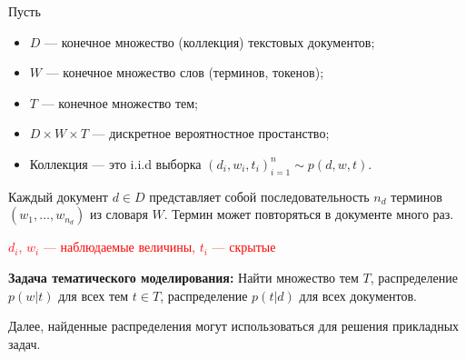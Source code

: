 \documentclass[unicode,9pt, pdf]{beamer}
\begin{document}
 \begin{frame}{Пусть}
    
    \begin{itemize}
        \item $D$ --- конечное множество (коллекция) текстовых документов;
        \item $W$ --- конечное множество слов (терминов, токенов);
        \item $T$ --- конечное множество тем;
         \item $D \times W \times T$ --- дискретное вероятностное простанство;
         \item Коллекция --- это i.i.d выборка $(d_i, w_i, t_i)^n_{i=1} \sim p(d, w, t)$.
     \end{itemize}
     
     \vspace{0.2 cm}
     
     Каждый документ $d \in D$ представляет собой последовательность $n_d$ терминов $(w_1, \ldots, w_{n_d})$ из словаря $W$. Термин может повторяться в документе много раз.
     
     \vspace{0.2 cm}
     
     \textcolor{red}{$d_i$, $w_i$ --- наблюдаемые величины, $t_i$ --- скрытые}
     
     \vspace{0.2 cm}
     
     \textbf{Задача тематического моделирования:} Найти множество тем $T$, распределение $p(w|t)$ для всех тем $t \in T$, распределение $p(t|d)$ для всех документов.
     
     \vspace{0.3 cm}
     
     
     Далее, найденные распределения могут использоваться для решения прикладных задач.
     
     \end{frame}
	
\end{document}
